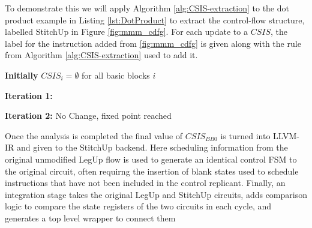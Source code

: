 To demonstrate this we will apply Algorithm \ref{alg:CSIS-extraction} to the
dot product example in Listing \ref{lst:DotProduct} to extract the control-flow structure, 
labelled StitchUp in Figure \ref{fig:mmm_cdfg}. 
For each update to a $\mathit{CSIS}$, the label for the instruction added from \ref{fig:mmm_cdfg} is given 
along with the rule from Algorithm \ref{alg:CSIS-extraction} used to add it. 

\vspace{1mm}
\noindent
\textbf{Initially} $\mathit{CSIS}_{i} = \emptyset$ for all basic blocks $i$

\vspace{-2mm}
\noindent
\hrulefill

\vspace{-1mm}
\noindent
\textbf{Iteration 1:}


\vspace{1mm}
\noindent
\textbf{Iteration 2:}\hspace{3mm} No Change, fixed point reached

\vspace{1mm}

Once the analysis is completed the final value of $\mathit{CSIS}_{\mathit{BB0}}$ is turned into LLVM-IR
and given to the StitchUp backend.
Here scheduling information from the original unmodified LegUp flow is used to generate
an identical control FSM to the original circuit, often requirng the insertion of blank states
used to schedule instructions that have not been included in the control replicant. 
Finally, an integration stage takes the original LegUp and StitchUp circuits,
adds comparison logic to compare the state registers of the two circuits in each cycle,
and generates a top level wrapper to connect them
